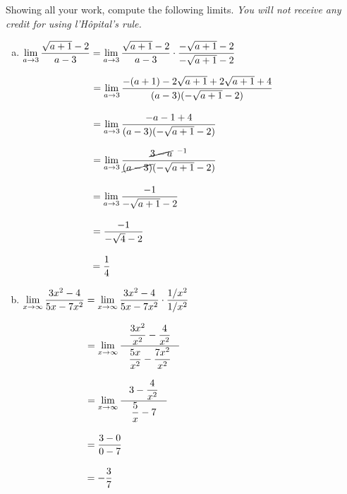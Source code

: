 \documentclass[12pt,letterpaper]{exam}
\begin{document}
\begin{questions}
\newpage
\question[20] Showing all your work, compute the following limits. {\itshape You will not receive any credit for using l'H\^opital's rule.} \par\vspace{0.3cm}
	\begin{enumerate}[(a)]
	\item $\displaystyle\lim_{a \to 3} \dfrac{\sqrt{a + 1} - 2}{a - 3}= \lim_{a \to 3} \dfrac{\sqrt{a + 1} - 2}{a - 3} \cdot \dfrac{-\sqrt{a + 1} - 2}{-\sqrt{a + 1} - 2}$ \par\vspace{0.3cm}
	$\ds\phantom{\lim_{a \to 3} \dfrac{\sqrt{a + 1} - 2}{a - 3}}= \lim_{a \to 3} \dfrac{-(a + 1) - 2 \sqrt{a + 1} + 2 \sqrt{a + 1} + 4}{(a - 3)(-\sqrt{a + 1} - 2)}$ \par\vspace{0.3cm}
	$\ds\phantom{\lim_{a \to 3} \dfrac{\sqrt{a + 1} - 2}{a - 3}}= \lim_{a \to 3} \dfrac{-a - 1 + 4}{(a - 3)(-\sqrt{a + 1} - 2)}$ \par\vspace{0.3cm}
	$\ds\phantom{\lim_{a \to 3} \dfrac{\sqrt{a + 1} - 2}{a - 3}}= \lim_{a \to 3} \dfrac{\cancel{3 - a}^{\;\;-1}}{\cancel{(a - 3)}(-\sqrt{a + 1} - 2)}$ \par\vspace{0.3cm}
	$\ds\phantom{\lim_{a \to 3} \dfrac{\sqrt{a + 1} - 2}{a - 3}}= \lim_{a \to 3} \dfrac{-1}{-\sqrt{a + 1} - 2}$ \par\vspace{0.3cm}
	$\ds\phantom{\lim_{a \to 3} \dfrac{\sqrt{a + 1} - 2}{a - 3}}= \dfrac{-1}{-\sqrt{4} - 2}$ \par\vspace{0.3cm}
	$\ds\phantom{\lim_{a \to 3} \dfrac{\sqrt{a + 1} - 2}{a - 3}}= \dfrac{1}{4}$ \par\vspace{0.72cm}
	
	\item $\displaystyle\lim_{x \to \infty} \dfrac{3x^2 - 4}{5x - 7x^2}= \lim_{x \to \infty} \dfrac{3x^2 - 4}{5x - 7x^2} \cdot \dfrac{1/x^2}{1/x^2}$ \par\vspace{0.3cm}
	$\ds\phantom{\lim_{x \to \infty} \dfrac{3x^2 - 4}{5x - 7x^2}}= \lim_{x \to \infty} \dfrac{\;\;\;\dfrac{3x^2}{x^2} - \dfrac{4}{x^2}\;\;\;}{\dfrac{5x}{x^2} - \dfrac{7x^2}{x^2}}$ \par\vspace{0.3cm}
	$\ds\phantom{\lim_{x \to \infty} \dfrac{3x^2 - 4}{5x - 7x^2}}= \lim_{x \to \infty} \dfrac{\;\;\;3 - \dfrac{4}{x^2}\;\;\;}{\dfrac{5}{x} - 7}$ \par\vspace{0.3cm} 
	$\ds\phantom{\lim_{x \to \infty} \dfrac{3x^2 - 4}{5x - 7x^2}}= \dfrac{3 - 0}{0 - 7}$ \par\vspace{0.3cm}
	$\ds\phantom{\lim_{x \to \infty} \dfrac{3x^2 - 4}{5x - 7x^2}}= -\dfrac{3}{7}$ \vfill
	

\end{enumerate}
\end{questions}
\end{document}
